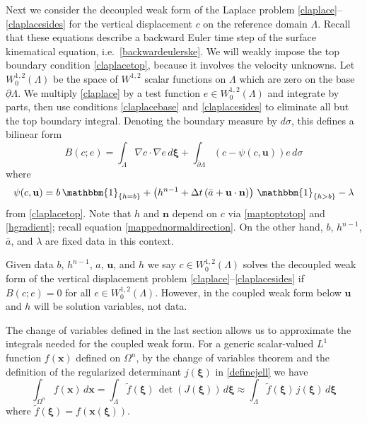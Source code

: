 \documentclass[letterpaper,final,12pt,reqno]{amsart}
\newcommand{\grad}{\nabla}
\newcommand{\bn}{\mathbf{n}}
\newcommand{\bu}{\mathbf{u}}
\newcommand{\bx}{\mathbf{x}}
\newcommand{\bxi}{\bm{\xi}}
\begin{document}
Next we consider the decoupled weak form of the Laplace problem \eqref{claplace}--\eqref{claplacesides} for the vertical displacement $c$ on the reference domain $\Lambda$.  Recall that these equations describe a backward Euler time step of the surface kinematical equation, i.e.~\eqref{backwardeulerske}.  We will weakly impose the top boundary condition \eqref{claplacetop}, because it involves the velocity unknowns.  Let $W_0^{1,2}(\Lambda)$ be the space of $W^{1,2}$ scalar functions on $\Lambda$ which are zero on the base $\underline{\partial} \Lambda$.  We multiply \eqref{claplace} by a test function $e \in W_0^{1,2}(\Lambda)$ and integrate by parts, then use conditions \eqref{claplacebase} and \eqref{claplacesides} to eliminate all but the top boundary integral.  Denoting the boundary measure by $d\sigma$, this defines a bilinear form
\begin{equation}
B(c;e) = \int_\Lambda \grad c \cdot \grad e \,d\bxi + \int_{\overline{\partial} \Lambda} (c - \psi(c,\bu)) e\,d\sigma \label{defineB}
\end{equation}
where
\begin{equation}
\psi(c,\bu) = b\, \mathbbm{1}_{\{h=b\}} + \left(h^{n-1} + \Delta t\left(\bar a + \bu \cdot \bn\right)\right)\, \mathbbm{1}_{\{h>b\}} - \lambda \label{definepsi}
\end{equation}
from \eqref{claplacetop}.
Note that $h$ and $\bn$ depend on $c$ via \eqref{maptoptotop} and \eqref{hgradient}; recall equation \eqref{mappednormaldirection}.  On the other hand, $b$, $h^{n-1}$, $\bar a$, and $\lambda$ are fixed data in this context.

Given data $b$, $h^{n-1}$, $a$, $\bu$, and $h$ we say $c \in W_0^{1,2}(\Lambda)$ solves the decoupled weak form of the vertical displacement problem \eqref{claplace}--\eqref{claplacesides} if $B(c;e)=0$ for all $e \in W_0^{1,2}(\Lambda)$.  However, in the coupled weak form below $\bu$ and $h$ will be solution variables, not data.

The change of variables defined in the last section allows us to approximate the integrals needed for the coupled weak form.  For a generic scalar-valued $L^1$ function $f(\bx)$ defined on $\Omega^n$, by the change of variables theorem and the definition of the regularized determinant $j(\bxi)$ in \eqref{definejell} we have
\begin{equation}
\int_{\Omega^n} f(\bx)\,d\bx = \int_\Lambda \tilde f(\bxi) \, \det(J(\bxi))\,d\bxi \approx \int_\Lambda \tilde f(\bxi) \, j(\bxi)\,d\bxi \label{changeintegral}
\end{equation}
where $\tilde f(\bxi) = f(\bx(\bxi))$.
\end{document}
